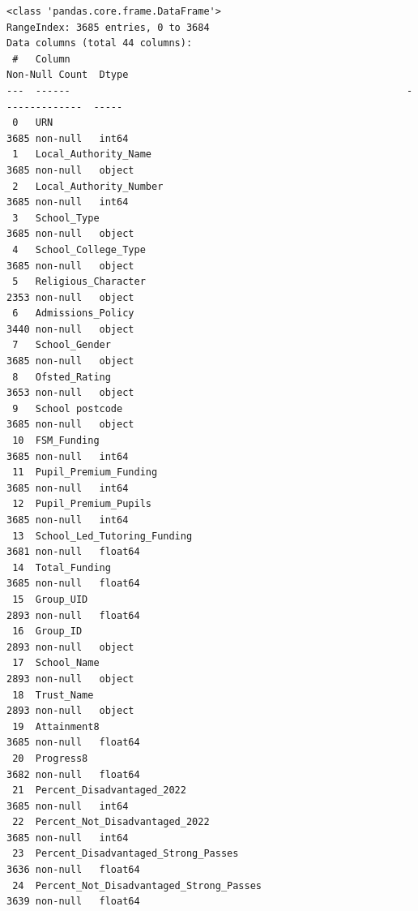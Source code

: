 \documentclass[
  letterpaper,
  DIV=11,
  numbers=noendperiod]{scrartcl}
\begin{document}
\begin{verbatim}
<class 'pandas.core.frame.DataFrame'>
RangeIndex: 3685 entries, 0 to 3684
Data columns (total 44 columns):
 #   Column                                                          Non-Null Count  Dtype  
---  ------                                                          --------------  -----  
 0   URN                                                             3685 non-null   int64  
 1   Local_Authority_Name                                            3685 non-null   object 
 2   Local_Authority_Number                                          3685 non-null   int64  
 3   School_Type                                                     3685 non-null   object 
 4   School_College_Type                                             3685 non-null   object 
 5   Religious_Character                                             2353 non-null   object 
 6   Admissions_Policy                                               3440 non-null   object 
 7   School_Gender                                                   3685 non-null   object 
 8   Ofsted_Rating                                                   3653 non-null   object 
 9   School postcode                                                 3685 non-null   object 
 10  FSM_Funding                                                     3685 non-null   int64  
 11  Pupil_Premium_Funding                                           3685 non-null   int64  
 12  Pupil_Premium_Pupils                                            3685 non-null   int64  
 13  School_Led_Tutoring_Funding                                     3681 non-null   float64
 14  Total_Funding                                                   3685 non-null   float64
 15  Group_UID                                                       2893 non-null   float64
 16  Group_ID                                                        2893 non-null   object 
 17  School_Name                                                     2893 non-null   object 
 18  Trust_Name                                                      2893 non-null   object 
 19  Attainment8                                                     3685 non-null   float64
 20  Progress8                                                       3682 non-null   float64
 21  Percent_Disadvantaged_2022                                      3685 non-null   int64  
 22  Percent_Not_Disadvantaged_2022                                  3685 non-null   int64  
 23  Percent_Disadvantaged_Strong_Passes                             3636 non-null   float64
 24  Percent_Not_Disadvantaged_Strong_Passes                         3639 non-null   float64

\end{verbatim}
\end{document}
